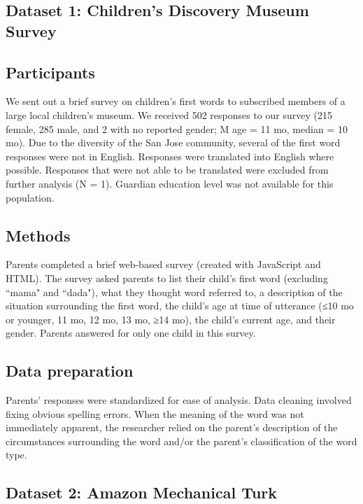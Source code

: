 \documentclass[10pt,letterpaper]{article}
\begin{document}
\subsection{Dataset 1: Children's Discovery Museum Survey}

\subsection{Participants}
We sent out a brief survey on children's first words to subscribed members of a large local children's museum. We received 502 responses to our survey (215 female, 285 male, and 2 with no reported gender; M age = 11 mo, median = 10 mo). Due to the diversity of the San Jose community, several of the first word responses were not in English. Responses were translated into English where possible. Responses that were not able to be translated were excluded from further analysis (N = 1). Guardian education level was not available for this population.

\subsection{Methods}
Parents completed a brief web-based survey (created with JavaScript and HTML). The survey asked parents to list their child's first word (excluding ``mama" and ``dada"), what they thought word referred to, a description of the situation surrounding the first word, the child's age at time of utterance (≤10 mo or younger, 11 mo, 12 mo, 13 mo, ≥14 mo), the child's current age, and their gender. Parents answered for only one child in this survey.

\subsection{Data preparation}
Parents' responses were standardized for ease of analysis. Data cleaning involved fixing obvious spelling errors. When the meaning of the word was not immediately apparent, the researcher relied on the parent's description of the circumstances surrounding the word and/or the parent's classification of the word type.

\subsection{Dataset 2: Amazon Mechanical Turk}
\end{document}
